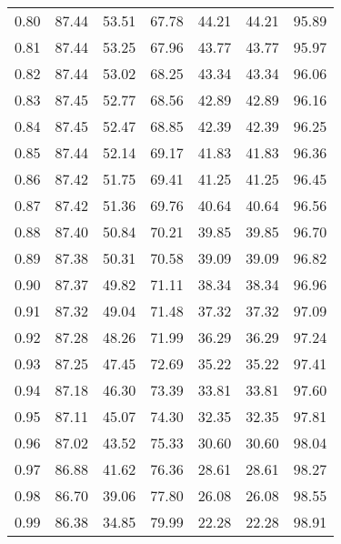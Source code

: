 \begin{tabular}{|c|c|c|c|c|c|c|}
      0.80 &     87.44 &     53.51 &      67.78 &   44.21 &      44.21 &         95.89 \\
      0.81 &     87.44 &     53.25 &      67.96 &   43.77 &      43.77 &         95.97 \\
      0.82 &     87.44 &     53.02 &      68.25 &   43.34 &      43.34 &         96.06 \\
      0.83 &     87.45 &     52.77 &      68.56 &   42.89 &      42.89 &         96.16 \\
      0.84 &     87.45 &     52.47 &      68.85 &   42.39 &      42.39 &         96.25 \\
      0.85 &     87.44 &     52.14 &      69.17 &   41.83 &      41.83 &         96.36 \\
      0.86 &     87.42 &     51.75 &      69.41 &   41.25 &      41.25 &         96.45 \\
      0.87 &     87.42 &     51.36 &      69.76 &   40.64 &      40.64 &         96.56 \\
      0.88 &     87.40 &     50.84 &      70.21 &   39.85 &      39.85 &         96.70 \\
      0.89 &     87.38 &     50.31 &      70.58 &   39.09 &      39.09 &         96.82 \\
      0.90 &     87.37 &     49.82 &      71.11 &   38.34 &      38.34 &         96.96 \\
      0.91 &     87.32 &     49.04 &      71.48 &   37.32 &      37.32 &         97.09 \\
      0.92 &     87.28 &     48.26 &      71.99 &   36.29 &      36.29 &         97.24 \\
      0.93 &     87.25 &     47.45 &      72.69 &   35.22 &      35.22 &         97.41 \\
      0.94 &     87.18 &     46.30 &      73.39 &   33.81 &      33.81 &         97.60 \\
      0.95 &     87.11 &     45.07 &      74.30 &   32.35 &      32.35 &         97.81 \\
      0.96 &     87.02 &     43.52 &      75.33 &   30.60 &      30.60 &         98.04 \\
      0.97 &     86.88 &     41.62 &      76.36 &   28.61 &      28.61 &         98.27 \\
      0.98 &     86.70 &     39.06 &      77.80 &   26.08 &      26.08 &         98.55 \\
      0.99 &     86.38 &     34.85 &      79.99 &   22.28 &      22.28 &         98.91 \\
\bottomrule
\end{tabular}
